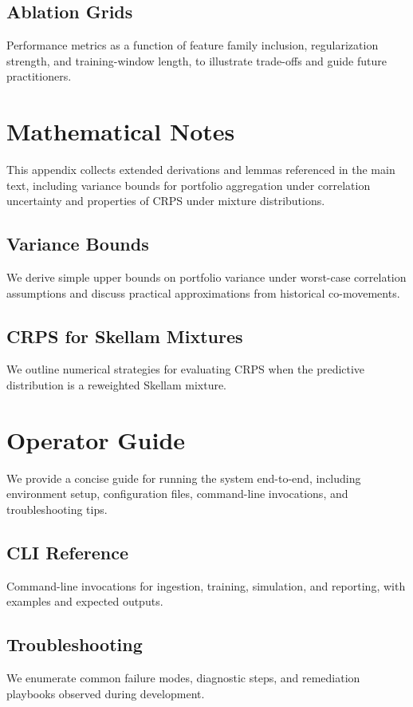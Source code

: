 \documentclass[12pt]{report}  %
\numberwithin{equation}{section}
\theoremstyle{plain}
\theoremstyle{definition}
\theoremstyle{remark}
\begin{document}
\section{Ablation Grids}
Performance metrics as a function of feature family inclusion, regularization strength, and training-window length, to illustrate trade-offs and guide future practitioners.

\chapter{Mathematical Notes}
This appendix collects extended derivations and lemmas referenced in the main text, including variance bounds for portfolio aggregation under correlation uncertainty and properties of CRPS under mixture distributions.

\section{Variance Bounds}
\fi
We derive simple upper bounds on portfolio variance under worst-case correlation assumptions and discuss practical approximations from historical co-movements.

\section{CRPS for Skellam Mixtures}
We outline numerical strategies for evaluating CRPS when the predictive distribution is a reweighted Skellam mixture.

\chapter{Operator Guide}
We provide a concise guide for running the system end-to-end, including environment setup, configuration files, command-line invocations, and troubleshooting tips.

\section{CLI Reference}
Command-line invocations for ingestion, training, simulation, and reporting, with examples and expected outputs.

\section{Troubleshooting}
We enumerate common failure modes, diagnostic steps, and remediation playbooks observed during development.
\end{document}
